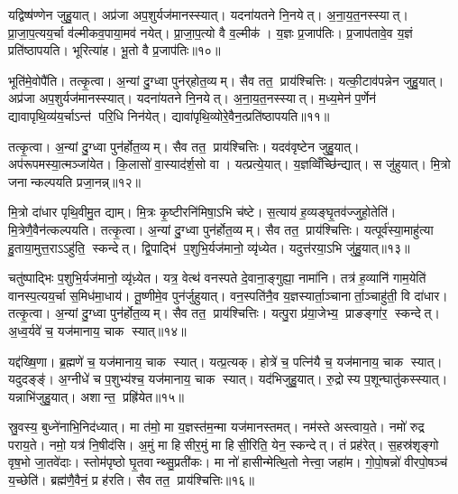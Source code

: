 यद्विष्ष॑ण्णेन जुहु॒यात्। अप्र॑जा अप॒शुर्यज॑मानस्स्यात्। यदना॑यतने नि॒नयेत्। अ॒ना॒य॒त॒नस्स्यात्। प्रा॒जा॒प॒त्यय॒र्चा व॑ल्मीकव॒पाया॒मव॑ नयेत्। प्रा॒जा॒प॒त्यो वै व॒ल्मीक॑। य॒ज्ञः प्र॒जाप॑तिः। प्र॒जाप॑तावे॒व य॒ज्ञं प्रति॑ष्ठापयति। भूरित्या॑ह। भू॒तो वै प्र॒जाप॑तिः॥१०॥

भूति॑मे॒वोपै॑ति। तत्कृ॒त्वा। अ॒न्यां दु॒ग्ध्वा पुन॑र्‌होत॒व्यम्। सैव तत॒ प्राय॑श्चित्तिः। यत्की॒टाव॑पन्नेन जुहु॒यात्। अप्र॑जा अप॒शुर्यज॑मानस्स्यात्। यदना॑यतने नि॒नयेत्। अ॒ना॒य॒त॒नस्स्यात्। म॒ध्य॒मेन॑ प॒र्णेन॑ द्यावापृथि॒व्य॑य॒र्चाऽन्त॑ परि॒धि निन॑येत्। द्यावा॑पृथि॒व्योरे॒वैन॒त्प्रति॑ष्ठापयति॥११॥

तत्कृ॒त्वा। अ॒न्यां दु॒ग्ध्वा पुन॑र्\mbox{}होत॒व्यम्। सैव तत॒ प्राय॑श्चित्तिः। यदव॑वृष्टेन जुहु॒यात्। अप॑रूपमस्या॒त्मञ्जा॑येत। कि॒लासो॑ वा॒स्याद॑र्\mbox{}श॒सो वा। यत्प्रत्ये॒यात्। य॒ज्ञव्विँच्छि॑न्द्यात्। स जु॑हुयात्। मि॒त्रो जनान्कल्पयति प्रजा॒नन्न्॥१२॥

मि॒त्रो दा॑धार पृथि॒वीमु॒त द्याम्। मि॒त्रः कृ॒ष्टीरनि॑मिषा॒ऽभि च॑ष्टे। स॒त्याय॑ ह॒व्यङ्घृ॒तव॑ज्जुहो॒तेति॑। मि॒त्रेणै॒वैन॑त्कल्पयति। तत्कृ॒त्वा। अ॒न्यां दु॒ग्ध्वा पुन॑र्\mbox{}होत॒व्यम्। सैव तत॒ प्राय॑श्चित्तिः। यत्पूर्व॑स्या॒माहु॑त्या हु॒ताया॒मुत्त॒राऽऽहु॑ति॒ स्कन्देत्। द्वि॒पाद्भि॑ प॒शुभि॒र्यज॑मानो॒ व्यृ॑ध्येत। यदुत्त॑रया॒ऽभि जु॑हु॒यात्॥१३॥

चतु॑ष्पाद्भिः प॒शुभि॒र्यज॑मानो॒ व्यृ॑ध़्येत। यत्र॒ वेत्थ॑ वनस्पते दे॒वाना॒ङ्गुह्या॒ नामा॑नि। तत्र॑ ह॒व्यानि॑ गाम॒येति॑ वानस्प॒त्यय॒र्चा स॒मिध॑मा॒धाय॑। तू॒ष्णीमे॒व पुन॑र्जुहुयात्। वन॒स्पति॑नै॒व य॒ज्ञस्यार्ता॒ञ्चानार्ता॒ञ्चाहु॑ती॒ वि दा॑धार। तत्कृ॒त्वा। अ॒न्यां दु॒ग्ध्वा पुन॑र्\mbox{}होत॒व्यम्। सैव तत॒ प्राय॑श्चित्तिः। यत्पु॒रा प्र॑या॒जेभ्य॒ प्राङङ्गा॑र॒ स्कन्देत्। अ॒ध्व॒र्यवे॑ च॒ यज॑मानाय॒ चाक स्यात्॥१४॥

यद्द॑ख्षि॒णा। ब्र॒ह्मणे॑ च॒ यज॑मानाय॒ चाक स्यात्। यत्प्र॒त्यक्। होत्रे॑ च॒ पत्नि॑यै च॒ यज॑मानाय॒ चाक स्यात्। यदुदङ्ङ्॑। अ॒ग्नीधे॑ च प॒शुभ्य॑श्च॒ यज॑मानाय॒ चाक स्यात्। यद॑भिजुहु॒यात्। रु॒द्रोस्य प॒शून्घातु॑कस्स्यात्। यन्नाभि॑जुहु॒यात्। अशान्त॒ प्रह्रि॑येत॥१५॥

स्रु॒वस्य॒ बुध्ने॑नाभि॒निद॑ध्यात्। मा त॑मो॒ मा य॒ज्ञस्त॑म॒न्मा यज॑मानस्तमत्। नम॑स्ते अस्त्वाय॒ते। नमो॑ रुद्र पराय॒ते। नमो॒ यत्र॑ नि॒षीद॑सि। अ॒मुं मा हिसीर॒मुं मा हिसी॒रिति॒ येन॒ स्कन्देत्। तं प्रह॑रेत्। स॒हस्र॑शृङ्गो वृष॒भो जा॒तवे॑दाः। स्तोम॑पृष्ठो घृ॒तवान्थ्सु॒प्रती॑कः। मा नो॑ हासीन्मेत्थि॒तो नेत्त्वा॒ जहा॑म। गो॒पो॒षन्नो॑ वीरपो॒षञ्च॑ य॒च्छेति॑। ब्रह्म॑णै॒वैनं॒ प्र ह॑रति। सैव तत॒ प्राय॑श्चित्तिः॥१६॥

